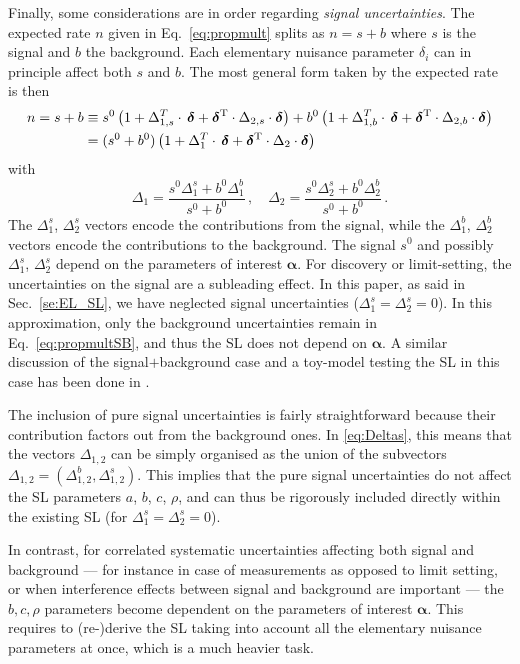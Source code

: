 \documentclass[11pt]{article}
\newcommand{\be}{\begin{equation}}
\newcommand{\ee}{\end{equation}}
\begin{document}
Finally, some considerations are in order regarding  \textit{signal uncertainties}. 
The expected rate $n$ given in Eq.~\eqref{eq:propmult} splits as $n=s+b$ where $s$ is the signal and $b$ the background. 
Each elementary nuisance parameter $\delta_i$ can in principle affect both $s$ and $b$. 
The most general form taken by the expected rate is then
\begin{align} n=s+b & \equiv s^{0} \left( 1+ \Delta_{1,s}^T\cdot \, \boldsymbol{\delta}+\boldsymbol{\delta}^{\rm T}\cdot\Delta_{2,s} \cdot \boldsymbol{\delta} \right) \nonumber
+ b^{0} \left( 1+ \Delta_{1,b}^T\cdot \, \boldsymbol{\delta}+\boldsymbol{\delta}^{\rm T}\cdot\Delta_{2,b} \cdot \boldsymbol{\delta} \right) \\
 & = (s^{0}+b^0) \left( 1+ \Delta_{1}^T\cdot \, \boldsymbol{\delta}+\boldsymbol{\delta}^{\rm T}\cdot\Delta_{2} \cdot \boldsymbol{\delta} \right)\,
\label{eq:propmultSB}
\end{align}
with
\be
\Delta_{1}= \frac{s^{0}\Delta_{1}^s+b^0 \Delta_{1}^b}{s^{0}+b^0}\,,\quad
\Delta_{2}= \frac{s^{0}\Delta_{2}^s+b^0 \Delta_{2}^b}{s^{0}+b^0}\,.
\label{eq:Deltas}
\ee
The $\Delta^s_{1}$, $\Delta^s_{2}$ vectors encode the contributions from the signal, while the $\Delta^b_{1}$, $\Delta^b_{2}$ vectors encode the contributions to the background. 
The signal $s^{0}$ and possibly $\Delta^s_{1}$, $\Delta^s_{2}$ depend on the parameters of interest ${\bm \alpha}$. 
For discovery or limit-setting, the uncertainties on the signal are a subleading effect. In this paper, as said in Sec.~\ref{se:EL_SL}, 
we have neglected signal uncertainties ($\Delta_{1}^s=\Delta_{2}^s=0$).
In this approximation, only the background uncertainties remain in Eq.~\eqref{eq:propmultSB}, 
and thus the SL does not depend on ${\bm \alpha}$. 
A similar discussion of the signal$+$background case and a toy-model testing the SL in this case has been done in \cite{Fichet:2016gvx}. 

The inclusion of pure signal uncertainties is fairly straightforward because their contribution factors out from the background ones. 
In \eqref{eq:Deltas}, this means that the vectors $\Delta_{1,2}$ can be simply organised as the union of the subvectors $\Delta_{1,2}=(\Delta^b_{1,2},\Delta^s_{1,2})$. 
This implies that the pure signal uncertainties do not affect the SL parameters $a$, $b$, $c$, $\rho$, and can thus be rigorously included directly within the existing SL (for $\Delta_{1}^s=\Delta_{2}^s=0$).

In contrast, for correlated systematic uncertainties affecting both signal and background --- for instance in case of measurements as opposed to limit setting, or when interference effects between signal and background are important --- 
the $b,c,\rho$ parameters  become dependent on the parameters of interest ${\bm \alpha}$.  
This requires to (re-)derive the SL taking into account all the elementary nuisance parameters at once, which is a much heavier task. 
\end{document}
